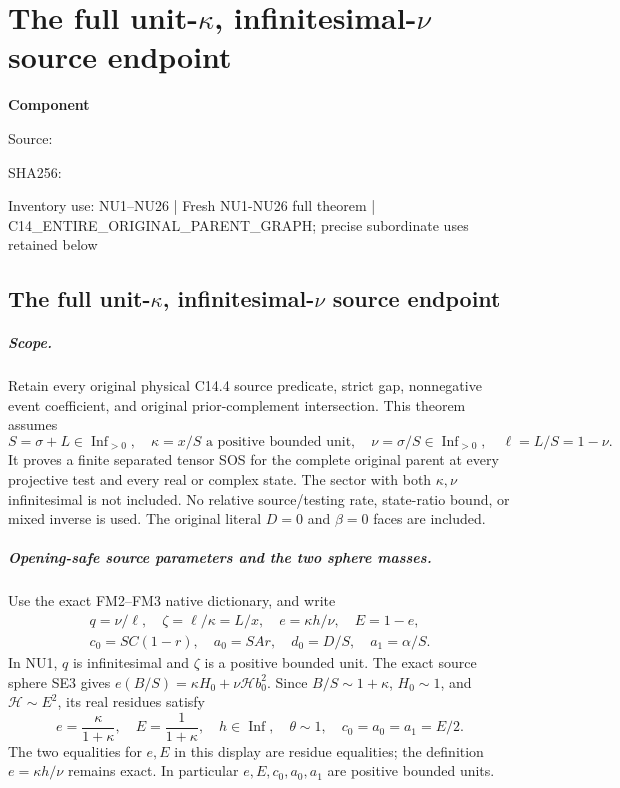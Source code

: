 \chapter{The full unit-$\kappa$, infinitesimal-$\nu$ source endpoint}
\label{component:p578719565e9d}
\noindent\textbf{Component }\par
{\small\noindent Source: \par}
{\small\noindent SHA256: \par}
{\small\noindent Inventory use: NU1--NU26 | Fresh NU1-NU26 full theorem | C14\_\allowbreak{}ENTIRE\_\allowbreak{}ORIGINAL\_\allowbreak{}PARENT\_\allowbreak{}GRAPH; precise subordinate uses retained below\par}
\medskip
\section{The full unit-$\kappa$, infinitesimal-$\nu$ source endpoint}
\label{p578719565e9d:sec:new-c144-nu-endpoint}

\paragraph{Scope.}
Retain every original physical C14.4 source predicate, strict gap,
nonnegative event coefficient, and original prior-complement intersection.
This theorem assumes
\[
 S=\sigma+L\in\operatorname{Inf}_{>0},\quad
 \kappa=x/S\text{ a positive bounded unit},\quad
 \nu=\sigma/S\in\operatorname{Inf}_{>0},\quad\ell=L/S=1-\nu.
 \tag{NU1}
\]
It proves a finite separated tensor SOS for the complete original
parent at every projective test and every real or complex state.
The sector with both $\kappa,\nu$ infinitesimal is not included.
No relative source/testing rate, state-ratio bound, or mixed inverse
is used. The original literal $D=0$ and $\beta=0$ faces are included.

\paragraph{Opening-safe source parameters and the two sphere masses.}
Use the exact FM2--FM3 native dictionary, and write
\[
\begin{gathered}
 q=\nu/\ell,\quad \zeta=\ell/\kappa=L/x,\quad
 e=\kappa h/\nu,\quad E=1-e,\\
 c_0=SC(1-r),\quad a_0=SAr,\quad d_0=D/S,\quad a_1=\alpha/S.
\end{gathered}
 \tag{NU2}
\]
In NU1, $q$ is infinitesimal and $\zeta$ is a positive bounded
unit. The exact source sphere SE3 gives
$e(B/S)=\kappa H_0+\nu\mathcal H b_0^2$.
Since $B/S\sim1+\kappa$, $H_0\sim1$, and
$\mathcal H\sim E^2$, its real residues satisfy
\[
 e=\frac\kappa{1+\kappa},\quad E=\frac1{1+\kappa},\quad
 h\in\operatorname{Inf},\quad\theta\sim1,\quad
 c_0=a_0=a_1=E/2.
 \tag{NU3}
\]
The two equalities for $e,E$ in this display are residue
equalities; the definition $e=\kappa h/\nu$ remains exact.
In particular $e,E,c_0,a_0,a_1$ are positive bounded units.

